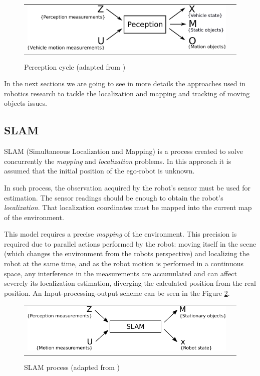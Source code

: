 \begin{figure}[h]
   \centering
     \begin{tabular}{lr}
       \includegraphics[scale=0.5]{img/fig:perception:cycle}
     \end{tabular}
   \caption{Perception cycle (adapted from \cite{VU-2009-454238})}
   \label{fig:perception:cycle}
 \end{figure}

In the next sections we are going to see in more details the approaches used in robotics research to tackle the localization and mapping and tracking of moving objects issues.

\subsection{SLAM}
SLAM (Simultaneous Localization and Mapping) is a process created to solve concurrently the \textit{mapping} and \textit{localization} problems\cite{VU-2009-454238}. In this approach it is assumed that the initial position of the ego-robot is unknown. 

In such process, the observation acquired by the robot's sensor must be used for estimation. The sensor readings should be enough to obtain the robot's \textit{localization}. That localization coordinates must be mapped into the current map of the environment. 

This model requires a precise \textit{mapping} of the environment. This precision is required due to parallel actions performed by the robot: moving itself in the scene (which changes the environment from the robots perspective) and localizing the robot at the same time, and as the robot motion is performed in a continuous space, any interference in the measurements are accumulated and can affect severely its localization estimation, diverging the calculated position from the real position. An Input-processing-output scheme can be seen in the Figure \ref{fig:perception:slam}.

\begin{figure}[h]
   \centering
     \begin{tabular}{lr}
       \includegraphics[scale=0.9]{img/fig:perception:slam}
     \end{tabular}
   \caption{SLAM process (adapted from \cite{Wang04a})}
   \label{fig:perception:slam}
\end{figure}


